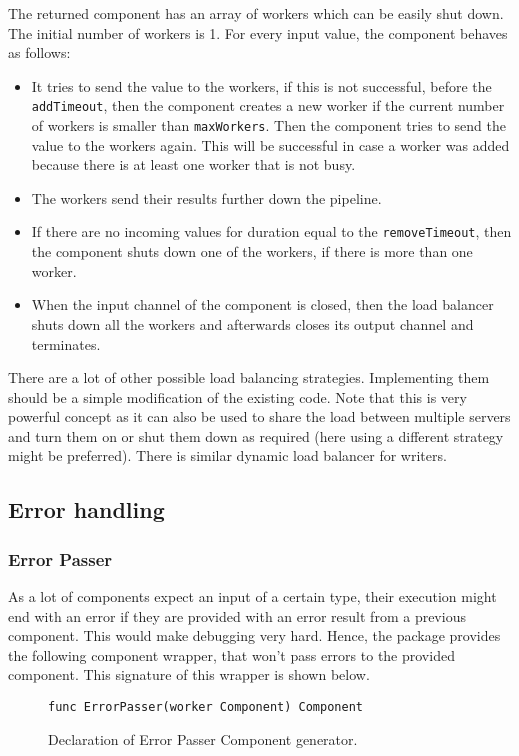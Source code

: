 The returned component has an array of workers which can be easily shut down.
The initial number of workers is 1. 
For every input value, the component behaves as follows:
\begin{itemize}
	\item It tries to send the value to the workers, if this is not successful, 
		  before the \texttt{addTimeout}, then the component creates a new worker
          if the current number of workers is smaller than \texttt{maxWorkers}.
          Then the component tries to send the value to the workers again. This will 
          be successful in case a worker was added because there is at least one 
          worker that is not busy.

	\item The workers send their results further down the pipeline.

	\item If there are no incoming values for duration equal to the 
          \texttt{removeTimeout}, then the component shuts down one 
          of the workers, if there is more than one worker.

	\item When the input channel of the component is closed, then the load balancer 
          shuts down all the workers and afterwards closes its output channel and
          terminates.
\end{itemize}
There are a lot of other possible load balancing strategies. 
Implementing them should be a simple modification of the existing code.
Note that this is very powerful concept as it can also be used to share
the load between multiple servers and turn them on or shut them down as
required (here using a different strategy might be preferred). There is
similar dynamic load balancer for writers.

\subsection{Error handling}

\subsubsection{Error Passer}
As a lot of components expect an input of a certain type, their execution
might end with an error if they are provided with an error result from
a previous component. This would make debugging very hard. Hence, the 
package provides the following component wrapper, that won't pass errors
to the provided component. This signature of this wrapper is shown below.
\begin{figure}[h]
\centering
\begin{lstlisting}
func ErrorPasser(worker Component) Component
\end{lstlisting}
\caption[scale=1.0]{Declaration of Error Passer Component generator.}
\label{fig:ErrorPasser}
\end{figure}

